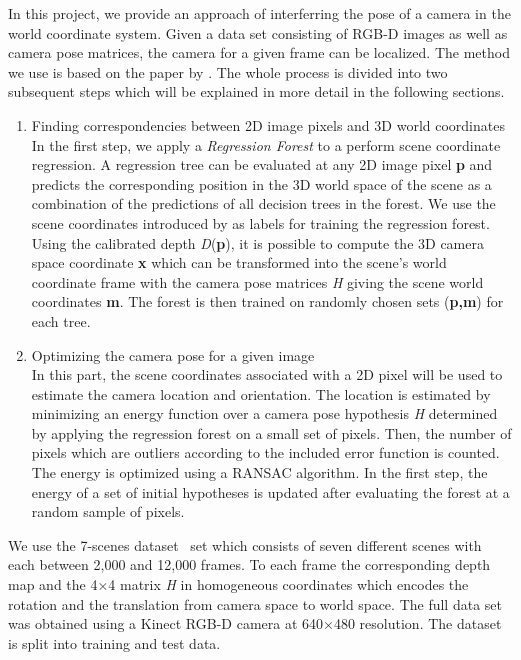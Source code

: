 \documentclass[final]{cvpr}
\begin{document}
In this project, we provide an approach of interferring the pose of a camera in the world coordinate system. Given a data set consisting of RGB-D images as well as camera pose matrices, the camera for a given frame can be localized. The method we use is based on the paper by \cite{shotton2013}.  The whole process is divided into two subsequent steps which will be explained in more detail in the following sections.
\begin{enumerate}
\item Finding correspondencies between 2D image pixels and 3D world coordinates  \\

In the first step, we apply a \textit{Regression Forest} to a perform scene coordinate regression. A regression tree can be evaluated at any 2D image pixel \textbf{p} and predicts the corresponding position in the 3D world space of the scene as a combination of the predictions of all decision trees in the forest. We use the scene coordinates introduced by \cite{shotton2013} as labels for training the regression forest. Using the calibrated depth \textit{D}(\textbf{p}), it is possible to compute the 3D camera space coordinate \textbf{x} which can be transformed into the scene's world coordinate frame with the camera pose matrices \textit{H} giving  the scene world coordinates \textbf{m}. The forest is then trained on randomly chosen sets (\textbf{p,m}) for each tree.

\item Optimizing the camera pose for a given image \\
In this part, the scene coordinates associated with a 2D pixel will be used to estimate the camera location and orientation. The location is estimated by minimizing an energy function over a camera pose hypothesis \textit{H} determined by applying the regression forest on a small set of pixels. Then, the number of pixels which are outliers according to the included error function is counted. The energy is optimized using a RANSAC algorithm. In the first step, the energy of a set of initial hypotheses is updated after evaluating the forest at a random sample of pixels.
\end{enumerate}
    
    


We use the 7-scenes dataset~\cite{glocker2013} set which consists of seven different scenes with each between 2,000 and 12,000 frames. To each frame the corresponding depth map and the 4×4 matrix \textit{H} in homogeneous coordinates which encodes the rotation and the translation from camera space to world space. The full data set was obtained using a Kinect RGB-D camera at 640×480 resolution. The dataset is split into training and test data.
\end{document}
